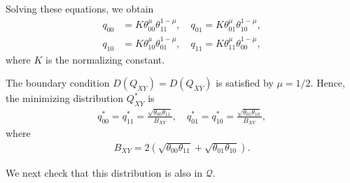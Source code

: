 \documentclass[journal,onecolumn]{IEEEtran}
\theoremstyle{definition}
\theoremstyle{remark}
\newcommand{\Dxy}{D({Q_{XY}})}
\newcommand{\Dbxby}{D({Q_{\bar{X}\bar{Y}}})}
\newcommand{\Qxy}{Q_{XY}}
\begin{document}
    Solving these equations, we obtain
    \begin{align*}
        q_{00}&=K\theta_{00}^{\mu}\theta_{11}^{1-\mu},\quad
        q_{01}=K\theta_{01}^{\mu}\theta_{10}^{1-\mu},\\
        q_{10}&=K\theta_{10}^{\mu}\theta_{01}^{1-\mu},\quad
        q_{11}=K\theta_{11}^{\mu}\theta_{00}^{1-\mu},
    \end{align*}
    where $K$ is the normalizing constant.

    The boundary condition $\Dxy=\Dbxby$ is satisfied by $\mu=1/2$.
    Hence, the minimizing distribution $\Qxy^*$ is
    \begin{align*}
        q_{00}^*=q_{11}^*
        =
        \frac{\sqrt{\theta_{00}\theta_{11}}}{B_{XY}},\quad
        q_{01}^*=q_{10}^*
        =
        \frac{\sqrt{\theta_{01}\theta_{10}}}{B_{XY}},
    \end{align*}
    where
    \begin{align*}
        B_{XY}
        =
        2\left(
            \sqrt{\theta_{00}\theta_{11}}
            +
            \sqrt{\theta_{01}\theta_{10}}
        \right).
    \end{align*}

    We next check that this distribution is also in $\mathcal{Q}$.
\end{document}
